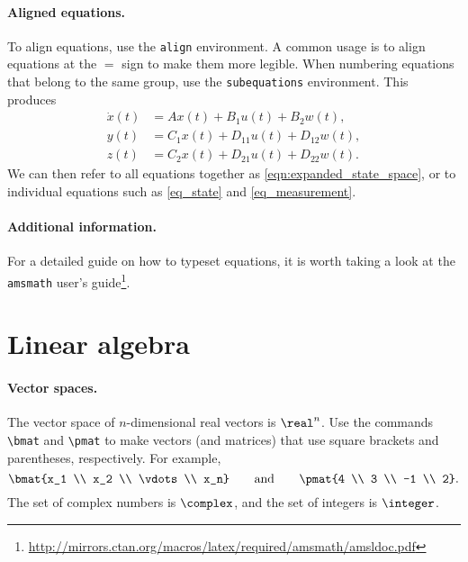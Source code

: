 \paragraph{Aligned equations.} To align equations, use the \verb|align| environment. A common usage is to align equations at the $=$ sign to make them more legible. When numbering equations that belong to the same group, use the \verb|subequations| environment. This produces
\begin{subequations} \label{eqn:expanded_state_space}
\begin{align}
\dot x(t) &= A   x(t) + B_1    u(t) + B_2    w(t), \label{eq_state}       \\
  	 y(t) &= C_1 x(t) + D_{11} u(t) + D_{12} w(t), \label{eq_measurement} \\
	 z(t) &= C_2   x(t) + D_{21} u(t) + D_{22} w(t). \label{eq_regulation}
\end{align}
\end{subequations}
We can then refer to all equations together as \eqref{eqn:expanded_state_space}, or to individual equations such as \eqref{eq_state} and \eqref{eq_measurement}.

\paragraph{Additional information.} For a detailed guide on how to typeset equations, it is worth taking a look at the \verb|amsmath| user's guide\footnote{\url{http://mirrors.ctan.org/macros/latex/required/amsmath/amsldoc.pdf}}.


\section{Linear algebra}

\paragraph{Vector spaces.} The vector space of $n$-dimensional real vectors is $\real^n$. Use the commands \verb|\bmat| and \verb|\pmat| to make vectors (and matrices) that use square brackets and parentheses, respectively. For example,
\[
  \bmat{x_1 \\ x_2 \\ \vdots \\ x_n} \qquad\text{and}\qquad \pmat{4 \\ 3 \\ -1 \\ 2}.
\]
The set of complex numbers is $\complex$, and the set of integers is $\integer$.


